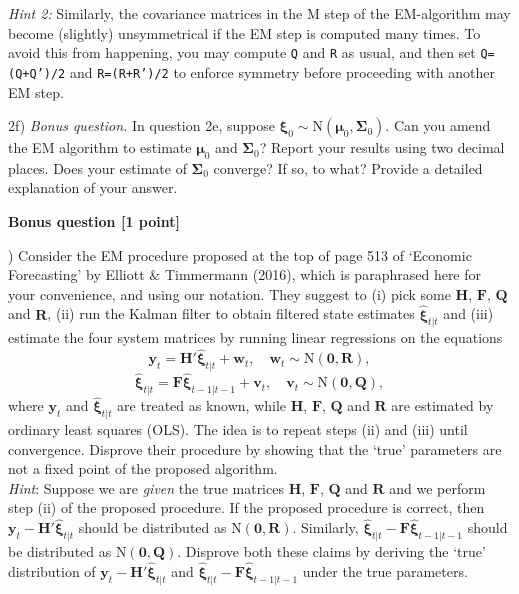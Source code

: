\documentclass[12pt, a4paper]{article}
\newcommand{\Vv}{\mathbf{v}}
\newcommand{\Ww}{\mathbf{w}}
\newcommand{\Yy}{\mathbf{y}}
\newcommand{\SSigma}{\boldsymbol{\Sigma}}
\newcommand{\FF}{\mathbf{F}}
\newcommand{\HH}{\mathbf{H}}
\newcommand{\QQ}{\mathbf{Q}}
\newcommand{\RR}{\mathbf{R}}
\newcommand{\Mmu}{\boldsymbol{\mu}}
\newcommand{\Xxi}{\boldsymbol{\xi}}
\begin{document}
\medskip

\noindent \emph{Hint 2:}  Similarly, the covariance matrices in the M step of the EM-algorithm may become (slightly) unsymmetrical if the EM step is computed many times. To avoid this from happening, you may compute \texttt{Q} and \texttt{R} as usual, and then set \texttt{Q=(Q+Q')/2} and \texttt{R=(R+R')/2} to enforce symmetry before proceeding with another EM step. 

\medskip\noindent 2f) \emph{Bonus question.} In question 2e, suppose $\Xxi_0\sim \mathrm{N}(\Mmu_0,\SSigma_0)$. Can you amend the EM algorithm to estimate $\Mmu_0$ and $\SSigma_0$? Report your results using two decimal places. Does your estimate of $\SSigma_0$ converge? If so, to what? Provide a detailed explanation of your answer.

\bigskip

\noindent \textbf{Bonus question [1 point]}

\medskip{}) Consider the EM procedure proposed at the top of page 513 of `Economic Forecasting' by Elliott $\&$ Timmermann (2016), which is paraphrased here for your convenience, and using our notation. They suggest to (i) pick some $\HH$, $\FF$, $\QQ$ and $\RR$, (ii) run the Kalman filter to obtain filtered state estimates $\hat{\Xxi}_{t|t}$ and (iii) estimate the four system matrices by running linear regressions on the equations
\[
\Yy_t = \HH' \hat{\Xxi}_{t|t} + \Ww_t, \quad \Ww_t \sim \mathrm{N}(\mathbf{0}, \RR),
\]
\[
\hat{\Xxi}_{t|t} = \FF \hat{\Xxi}_{t-1|t-1} + \Vv_t, \quad \Vv_t \sim \mathrm{N}(\mathbf{0}, \QQ),
\]
where $\Yy_t$ and $\hat{\Xxi}_{t|t}$ are treated as known, while $\HH$, $\FF$, $\QQ$ and $\RR$ are estimated by ordinary least squares (OLS). The idea is to repeat steps (ii) and (iii) until convergence. Disprove their procedure by showing that the `true' parameters are not a fixed point of the proposed algorithm. \\

\noindent \emph{Hint}: Suppose we are \emph{given} the true matrices $\HH$, $\FF$, $\QQ$ and $\RR$ and we perform step (ii) of the proposed procedure. If the proposed procedure is correct, then  $\Yy_t - \HH' \hat{\Xxi}_{t|t}$ should be distributed as $\mathrm{N}(\mathbf{0},\RR)$. Similarly, $\hat{\Xxi}_{t|t}- \FF \hat{\Xxi}_{t-1|t-1}$ should be distributed as $\mathrm{N}(\mathbf{0},\QQ)$. Disprove both these claims by deriving the `true' distribution of $\Yy_t - \HH' \hat{\Xxi}_{t|t}$ and $\hat{\Xxi}_{t|t}- \FF \hat{\Xxi}_{t-1|t-1}$ under the true parameters.
\end{document}
